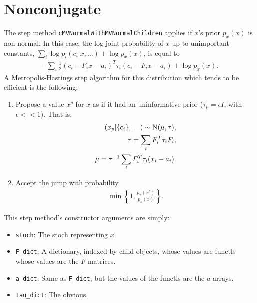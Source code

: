 \documentclass{article}
\begin{document}
\section{Nonconjugate}\label{non}
The step method \texttt{cMVNormalWithMVNormalChildren} applies if $x$'s prior $p_x(x)$ is non-normal. In this case, the log joint probability of $x$ up to unimportant constants, $\sum_i \log p_i(c_i|x,\ldots) + \log p_x(x)$, is equal to
\begin{eqnarray*}
	-\sum_i\frac{1}{2}(c_i-F_ix-a_i)^T\tau_i(c_i-F_ix-a_i) +\log p_x(x).
\end{eqnarray*}
A Metropolis-Hastings step algorithm for this distribution which tends to be efficient is the following:
\begin{enumerate}
	\item Propose a value $x^p$ for $x$ as if it had an uninformative prior ($\tau_p = \epsilon I$, with $\epsilon << 1$). That is,
	\begin{eqnarray*}
		(x_p|\{c_i\},\ldots)\sim\textup{N}(\mu,\tau),\\
		\tau = \sum_i F_i^T \tau_i F_i,\\
		\mu = \tau^{-1}\sum_i F_i^T\tau_i(x_i-a_i).
	\end{eqnarray*}	
	\item Accept the jump with probability
	\begin{eqnarray*}
		\min\left\{1,\frac{p_x(x^p)}{p_x(x)}\right\}.
	\end{eqnarray*}
\end{enumerate}

This step method's constructor arguments are simply:
\begin{itemize}
	\item \texttt{stoch}: The stoch representing $x$. 
	\item \texttt{F\_dict}: A dictionary, indexed by child objects, whose values are functls whose values are the $F$ matrices. 
	\item \texttt{a\_dict}: Same as \texttt{F\_dict}, but the values of the functls are the $a$ arrays.
	\item \texttt{tau\_dict}: The obvious.
\end{itemize}
\end{document}
